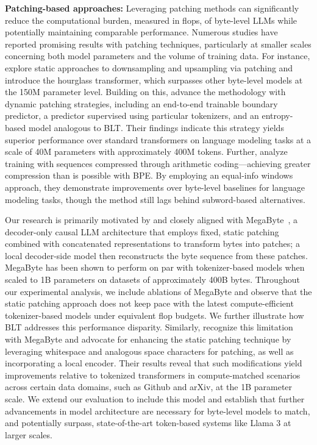 \textbf{Patching-based approaches:} Leveraging patching methods can significantly reduce the computational burden, measured in flops, of byte-level LLMs while potentially maintaining comparable performance. Numerous studies have reported promising results with patching techniques, particularly at smaller scales concerning both model parameters and the volume of training data. For instance, \cite{nawrot-etal-2022-hierarchical} explore static approaches to downsampling and upsampling via patching and introduce the hourglass transformer, which surpasses other byte-level models at the 150M parameter level. Building on this, \cite{nawrot-etal-2023-efficient} advance the methodology with dynamic patching strategies, including an end-to-end trainable boundary predictor, a predictor supervised using particular tokenizers, and an entropy-based model analogous to {\textsc BLT}. Their findings indicate this strategy yields superior performance over standard transformers on language modeling tasks at a scale of 40M parameters with approximately 400M tokens. Further, \cite{lester2024training} analyze training with sequences compressed through arithmetic coding—achieving greater compression than is possible with BPE. By employing an equal-info windows approach, they demonstrate improvements over byte-level baselines for language modeling tasks, though the method still lags behind subword-based alternatives.

Our research is primarily motivated by and closely aligned with MegaByte~\citep{yu2023megabyte}, a decoder-only causal LLM architecture that employs fixed, static patching combined with concatenated representations to transform bytes into patches; a local decoder-side model then reconstructs the byte sequence from these patches. MegaByte has been shown to perform on par with tokenizer-based models when scaled to 1B parameters on datasets of approximately 400B bytes. Throughout our experimental analysis, we include ablations of MegaByte and observe that the static patching approach does not keep pace with the latest compute-efficient tokenizer-based models under equivalent flop budgets. We further illustrate how {\textsc BLT} addresses this performance disparity. Similarly, \cite{slagle2024spacebyte} recognize this limitation with MegaByte and advocate for enhancing the static patching technique by leveraging whitespace and analogous space characters for patching, as well as incorporating a local encoder. Their results reveal that such modifications yield improvements relative to tokenized transformers in compute-matched scenarios across certain data domains, such as Github and arXiv, at the 1B parameter scale. We extend our evaluation to include this model and establish that further advancements in model architecture are necessary for byte-level models to match, and potentially surpass, state-of-the-art token-based systems like Llama 3 at larger scales.


